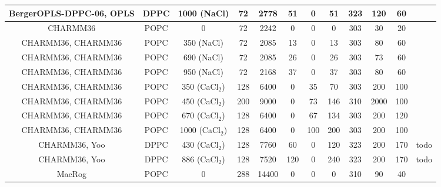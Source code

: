 \documentclass[pre,aps,floatfix,authordate1-4,twocolumn]{revtex4-1}
\begin{document}
\begin{table}[htb]
\begin{tabular}{c c c c c c c c c c c c}
  BergerOPLS-DPPC-06\cite{tieleman06}, OPLS\cite{aqvist90} &   DPPC & 1000 (NaCl) & 72 & 2778 & 51  & 0  & 51 &323  & 120 & 60 &\cite{bergerOPLSDPPCfiles1000mMnacl} \\
  \hline
  CHARMM36\cite{klauda10}   & POPC & 0           & 72 & 2242 & 0  & 0 & 0 & 303  & 30 & 20 & \cite{charmm36filesSHORT} \\
  CHARMM36\cite{klauda10}, CHARMM36\cite{venable13} & POPC & 350 (NaCl)  & 72 & 2085 & 13  & 0 & 13 & 303  & 80 & 60 & \cite{charmmPOPC350mMNaClfiles} \\
  CHARMM36\cite{klauda10}, CHARMM36\cite{venable13} & POPC & 690 (NaCl)  & 72 & 2085 & 26  & 0 & 26 & 303  & 73 & 60 & \cite{charmmPOPC690mMNaClfiles}   \\
  CHARMM36\cite{klauda10}, CHARMM36\cite{venable13}  & POPC & 950 (NaCl)  & 72 & 2168 & 37  & 0 & 37 & 303  & 80 & 60 &\cite{charmmPOPC950mMNaClfiles}  \\
  CHARMM36\cite{klauda10}, CHARMM36 & POPC &  350 (CaCl$_2$)  & 128 & 6400 & 0& 35 & 70 & 303  & 200  & 100 & \cite{charmmPOPC350mMCaClfiles}  \\
  CHARMM36\cite{klauda10}, CHARMM36 & POPC &  450 (CaCl$_2$)  & 200 & 9000 & 0& 73 & 146 & 310  & 2000  & 100 & \cite{charmmPOPC450mMCaClfiles}  \\
  CHARMM36\cite{klauda10}, CHARMM36 & POPC &  670 (CaCl$_2$)  & 128 & 6400 & 0& 67 & 134 & 303  & 200  & 120 & \cite{charmmPOPC670mMCaClfiles}  \\  
  CHARMM36\cite{klauda10}, CHARMM36 & POPC &  1000 (CaCl$_2$) & 128 & 6400 & 0& 100 & 200 & 303 & 200  & 100 & \cite{charmmPOPC1000mMCaClfiles}  \\
  \hline
  CHARMM36\cite{klauda10}, Yoo\cite{yoo16}  & DPPC & 430 (CaCl$_2$)  & 128 & 7760 & 60  & 0 & 120 & 323  & 200 & 170 &todo  \\
  CHARMM36\cite{klauda10}, Yoo\cite{yoo16}  & DPPC & 886 (CaCl$_2$)  & 128 & 7520 & 120  & 0 & 240 & 323  & 200 & 170 &todo  \\
  \hline
  MacRog\cite{maciejewski14}  & POPC & 0 & 288 & 14400 & 0 & 0 & 0 & 310 & 90&40  &~\cite{macrogdehydFILES}  \\

\end{tabular}
\end{table}
\end{document}
